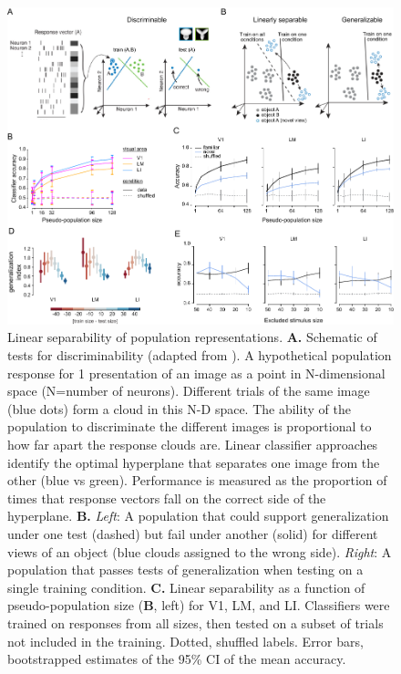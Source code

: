 \begin{figure}[t!]
    \includegraphics[width=\textwidth]{figures/chapter_4/fig_4-4_neural_generalization/fig_4-4_neural_generalization.pdf}
    \vspace{.1in}
    \caption[Population representations of objects]{Linear separability of population representations. 
    \textbf{A.} Schematic of tests for discriminability (adapted from \cite{Rust2010SelectivityIT}). A hypothetical population response for 1 presentation of an image as a point in N-dimensional space (N=number of neurons). Different trials of the same image (blue dots) form a cloud in this N-D space. The ability of the population to discriminate the different images is proportional to how far apart the response clouds are. Linear classifier approaches identify the optimal hyperplane that separates one image from the other (blue vs green). Performance is measured as the proportion of times that response vectors fall on the correct side of the hyperplane. 
    \textbf{B.} \textit{Left}: A population that could support generalization under one test (dashed) but fail under another (solid) for different views of an object (blue clouds assigned to the wrong side). \textit{Right}: A population that passes tests of generalization when testing on a single training condition.
    \textbf{C.} Linear separability as a function of pseudo-population size (\textbf{B}, left) for V1, LM, and LI. Classifiers were trained on responses from all sizes, then tested on a subset of trials not included in the training. Dotted, shuffled labels. Error bars, bootstrapped estimates of the 95\% CI of the mean accuracy. 
}
\end{figure}

